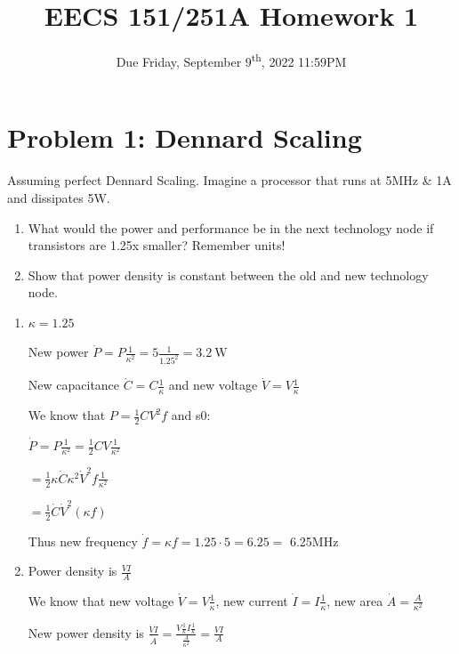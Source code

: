 

\def\PYZsq{\textquotesingle}

\newcommand{\assignmentname}{EECS 151/251A Homework 1}
\newcommand{\versionstamp}{Version: 1 - \DTMnow}

\title{\vspace{-0.4in}\Large \bf \assignmentname \vspace{-0.1in}}
\author{Due Friday, September 9\textsuperscript{th}, 2022 11:59PM}

\date{}
\maketitle

\thispagestyle{plain}

\section*{Problem 1: Dennard Scaling}
Assuming perfect Dennard Scaling. Imagine a processor that runs at 5MHz \& 1A and dissipates 5W.
\begin{enumerate}[label=(\alph*)]
\item What would the power and performance be in the next technology node if transistors are 1.25x smaller? Remember units!

\item Show that power density is constant between the old and new technology node.

\end{enumerate}

\begin{solution}
\begin{enumerate}[label=(\alph*)]

\item $\kappa = 1.25$

New power $\dot P = P \frac{1}{\kappa^2} = 5 \frac{1}{1.25^2} =  \SI{3.2}{\watt}$ 

New capacitance $\dot C = C \frac{1}{\kappa}$ and new voltage $\dot V = V \frac{1}{\kappa}$

We know that $P = \frac{1}{2}C V^2f$ and s0:

$\dot P = P \frac{1}{\kappa^2} = \frac{1}{2}CV \frac{1}{\kappa^2} $

$=\frac{1}{2} \kappa \dot C \kappa^2 \dot V^2f\frac{1}{\kappa^2}$

$= \frac{1}{2} \dot C \dot V^2 (\kappa f)$

Thus new frequency $\dot f = \kappa f = 1.25 \cdot 5 = 6.25 = $ 6.25MHz

\item Power density is $\frac{V I}{A}$

We know that new voltage $\dot V = V \frac{1}{\kappa}$, new current $\dot I = I \frac{1}{\kappa}$, new area $\dot A = \frac{A}{\kappa^2}$

New power density is $\frac{\dot V \dot I}{\dot A} = \frac{V \frac{1}{\kappa} I \frac{1}{\kappa}}{\frac{A}{\kappa^2}} = \frac{V I}{A}$
\end{enumerate}

\end{solution}

